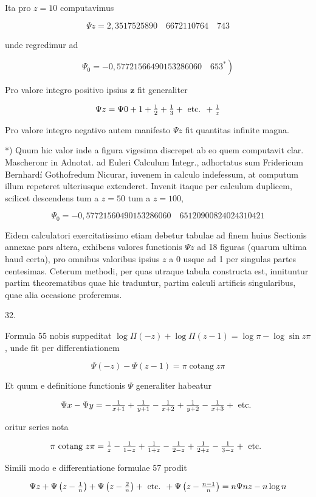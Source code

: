 \documentclass[twoside,12pt, showframe]{memoir}
\let\oldfrac\frac
\def\frac#1#2{\mathchoice{\tfrac{#1}{#2}}{\oldfrac{#1}{#2}}{\genfrac{}{}{}{2}{#1}{#2\mathstrut}}{\genfrac{}{}{}{3}{#1}{#2\mathstrut}}}
\begin{document}
Ita pro \(z=10\) computavimus

\[
\Psi z=2,3517525890 \quad 6672110764 \quad 743
\]

unde regredimur ad

\[
\left.\Psi_{0}=-0,57721566490153286060 \quad 653^{*}\right)
\]

Pro valore integro positivo ipsius \(\boldsymbol{z}\) fit generaliter

\[
\Psi z=\Psi 0+1+\frac{1}{2}+\frac{1}{3}+\text { etc. }+\frac{1}{z}
\]

Pro valore integro negativo autem manifesto \(\Psi z\) fit quantitas infinite magna.

*) Quum hic valor inde a figura vigesima discrepet ab eo quem computavit clar. Mascheronr in Adnotat. ad Euleri Calculum Integr., adhortatus sum Fridericum Bernhardí Gothofredum Nicurar, iuvenem in calculo indefessum, at computum illum repeteret ulteriusque extenderet. Invenit itaque per calculum duplicem, scilicet descendens tum a \(z=50\) tum a \(z=100\),

\[
\Psi_{0}=-0,57721560490153286060 \quad 65120900824024310421
\]

Eidem calculatori exercitatissimo etiam debetur tabulae ad finem huius Sectionis annexae pars altera, exhibens valores functionis \(\Psi z\) ad 18 figuras (quarum ultima haud certa), pro omnibus valoribus ipsius \(z\) a 0 usque ad 1 per singulas partes centesimas. Ceterum methodi, per quas utraque tabula constructa est, innituntur partim theorematibus quae hic traduntur, partim calculi artificis singularibus, quae alia occasione proferemus.

32.

Formula 55 nobis suppeditat \(\log \Pi(-z)+\log \Pi(z-1)=\log \pi-\log \sin z \pi\), unde fit per differentiationem

\[
\Psi(-z)-\Psi(z-1)=\pi \operatorname{cotang} z \pi
\]

Et quum e definitione functionis \(\Psi\) generaliter habeatur

\[
\Psi x-\Psi y=-\frac{1}{x+1}+\frac{1}{y+1}-\frac{1}{x+2}+\frac{1}{y+2}-\frac{1}{x+3}+\text { etc. }
\]

oritur series nota

\[
\pi \text { cotang } z \pi=\frac{1}{z}-\frac{1}{1-z}+\frac{1}{1+z}-\frac{1}{2-z}+\frac{1}{2+z}-\frac{1}{3-z}+\text { etc. }
\]

Simili modo e differentiatione formulae 57 prodit

\[
\Psi z+\Psi\left(z-\frac{1}{n}\right)+\Psi\left(z-\frac{2}{n}\right)+\text { etc. }+\Psi\left(z-\frac{n-1}{n}\right)=n \Psi n z-n \log n
\]
\end{document}
